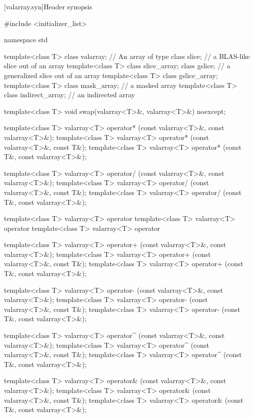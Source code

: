 [valarray.syn]{Header  synopsis}
%
%
\begin{codeblock}
#include <initializer_list>

namespace std {
  template<class T> class valarray;         // An array of type 
  class slice;                              // a BLAS-like slice out of an array
  template<class T> class slice_array;
  class gslice;                             // a generalized slice out of an array
  template<class T> class gslice_array;
  template<class T> class mask_array;       // a masked array
  template<class T> class indirect_array;   // an indirected array

  template<class T> void swap(valarray<T>&, valarray<T>&) noexcept;

  template<class T> valarray<T> operator* (const valarray<T>&, const valarray<T>&);
  template<class T> valarray<T> operator* (const valarray<T>&, const T&);
  template<class T> valarray<T> operator* (const T&, const valarray<T>&);

  template<class T> valarray<T> operator/ (const valarray<T>&, const valarray<T>&);
  template<class T> valarray<T> operator/ (const valarray<T>&, const T&);
  template<class T> valarray<T> operator/ (const T&, const valarray<T>&);

  template<class T> valarray<T> operator%
  template<class T> valarray<T> operator%
  template<class T> valarray<T> operator%

  template<class T> valarray<T> operator+ (const valarray<T>&, const valarray<T>&);
  template<class T> valarray<T> operator+ (const valarray<T>&, const T&);
  template<class T> valarray<T> operator+ (const T&, const valarray<T>&);

  template<class T> valarray<T> operator- (const valarray<T>&, const valarray<T>&);
  template<class T> valarray<T> operator- (const valarray<T>&, const T&);
  template<class T> valarray<T> operator- (const T&, const valarray<T>&);

  template<class T> valarray<T> operator^ (const valarray<T>&, const valarray<T>&);
  template<class T> valarray<T> operator^ (const valarray<T>&, const T&);
  template<class T> valarray<T> operator^ (const T&, const valarray<T>&);

  template<class T> valarray<T> operator& (const valarray<T>&, const valarray<T>&);
  template<class T> valarray<T> operator& (const valarray<T>&, const T&);
  template<class T> valarray<T> operator& (const T&, const valarray<T>&);

}
\end{codeblock}
